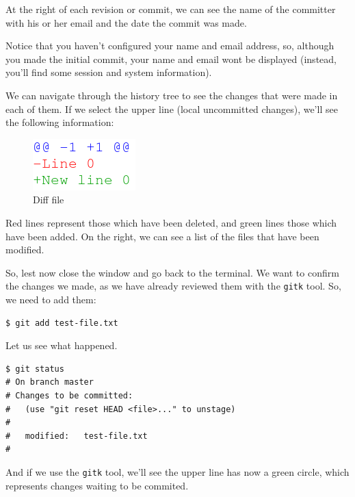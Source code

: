 \documentclass[a4paper,10pt]{article}
\newenvironment{terminal}
  {
    \vspace{+10pt}
    \begin{center}
    \begin{minipage}{0.95\textwidth}
    \begin{framed}
  }
  {
    \end{framed}
    \end{minipage}
    \end{center}
    \vspace{+10pt}
  }
\begin{document}
At the right of each revision or commit, we can see the name of the
committer with his or her email and the date the commit was made.

\begin{tip}
Notice that you haven't configured your name and email address, so,
although you made the initial commit, your name and email wont be
displayed (instead, you'll find some session and system information).
\end{tip}

We can navigate through the history tree to see the changes that were
made in each of them. If we select the upper line (local uncommitted
changes), we'll see the following information:

\begin{figure}[h]
  \begin{center}
    \includegraphics[scale=0.5]{git_example-01}
  \end{center}
  \caption{Diff file}
\end{figure}

Red lines represent those which have been deleted, and green lines those
which have been added. On the right, we can see a list of the files
that have been modified.

So, lest now close the window and go back to the terminal. We want to
confirm the changes we made, as we have already reviewed them with the
\texttt{gitk} tool. So, we need to add them:

\begin{terminal}
\begin{verbatim}
$ git add test-file.txt
\end{verbatim}
\end{terminal}

Let us see what happened.

\begin{terminal}
\begin{verbatim}
$ git status
# On branch master
# Changes to be committed:
#   (use "git reset HEAD <file>..." to unstage)
#
#	modified:   test-file.txt
#
\end{verbatim}
\end{terminal}

And if we use the \texttt{gitk} tool, we'll see the upper line has now
a green circle, which represents changes waiting to be commited.
\end{document}
